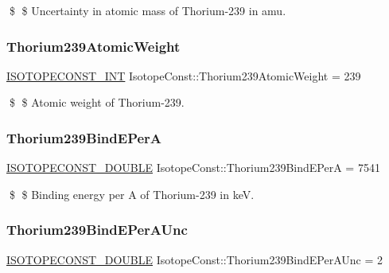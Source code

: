 \$ \$ Uncertainty in atomic mass of Thorium-\/239 in amu. \mbox{\label{group___isotope_const-_thorium-_th239_ga7ee81ecf935c5b02d5c3b64af484842d}} 
\subsubsection{\texorpdfstring{Thorium239\+Atomic\+Weight}{Thorium239AtomicWeight}}
{\footnotesize\ttfamily \mbox{\hyperlink{group___isotope_const-_macros_ga5f18360b3e99483a35c32d789e62621c}{I\+S\+O\+T\+O\+P\+E\+C\+O\+N\+S\+T\+\_\+\+I\+NT}} Isotope\+Const\+::\+Thorium239\+Atomic\+Weight = 239}

\$ \$ Atomic weight of Thorium-\/239. \mbox{\label{group___isotope_const-_thorium-_th239_gac96ac40c5064481e0315cddfe2f80d2c}} 
\subsubsection{\texorpdfstring{Thorium239\+Bind\+E\+PerA}{Thorium239BindEPerA}}
{\footnotesize\ttfamily \mbox{\hyperlink{group___isotope_const-_macros_ga8f45a7272ce02c0b4c65c44636ed719a}{I\+S\+O\+T\+O\+P\+E\+C\+O\+N\+S\+T\+\_\+\+D\+O\+U\+B\+LE}} Isotope\+Const\+::\+Thorium239\+Bind\+E\+PerA = 7541}

\$ \$ Binding energy per A of Thorium-\/239 in keV. \mbox{\label{group___isotope_const-_thorium-_th239_ga12daa20b89917659fd5d15024f7c431b}} 
\subsubsection{\texorpdfstring{Thorium239\+Bind\+E\+Per\+A\+Unc}{Thorium239BindEPerAUnc}}
{\footnotesize\ttfamily \mbox{\hyperlink{group___isotope_const-_macros_ga8f45a7272ce02c0b4c65c44636ed719a}{I\+S\+O\+T\+O\+P\+E\+C\+O\+N\+S\+T\+\_\+\+D\+O\+U\+B\+LE}} Isotope\+Const\+::\+Thorium239\+Bind\+E\+Per\+A\+Unc = 2}

